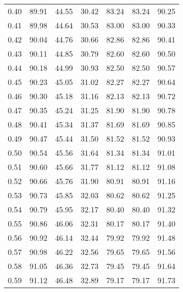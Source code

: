 \begin{tabular}{|c|c|c|c|c|c|c|}
      0.40 &     89.91 &     44.55 &      30.42 &   83.24 &      83.24 &         90.25 \\
      0.41 &     89.98 &     44.64 &      30.53 &   83.00 &      83.00 &         90.33 \\
      0.42 &     90.04 &     44.76 &      30.66 &   82.86 &      82.86 &         90.41 \\
      0.43 &     90.11 &     44.85 &      30.79 &   82.60 &      82.60 &         90.50 \\
      0.44 &     90.18 &     44.99 &      30.93 &   82.50 &      82.50 &         90.57 \\
      0.45 &     90.23 &     45.05 &      31.02 &   82.27 &      82.27 &         90.64 \\
      0.46 &     90.30 &     45.18 &      31.16 &   82.13 &      82.13 &         90.72 \\
      0.47 &     90.35 &     45.24 &      31.25 &   81.90 &      81.90 &         90.78 \\
      0.48 &     90.41 &     45.34 &      31.37 &   81.69 &      81.69 &         90.85 \\
      0.49 &     90.47 &     45.44 &      31.50 &   81.52 &      81.52 &         90.93 \\
      0.50 &     90.54 &     45.56 &      31.64 &   81.34 &      81.34 &         91.01 \\
      0.51 &     90.60 &     45.66 &      31.77 &   81.12 &      81.12 &         91.08 \\
      0.52 &     90.66 &     45.76 &      31.90 &   80.91 &      80.91 &         91.16 \\
      0.53 &     90.73 &     45.85 &      32.03 &   80.62 &      80.62 &         91.25 \\
      0.54 &     90.79 &     45.95 &      32.17 &   80.40 &      80.40 &         91.32 \\
      0.55 &     90.86 &     46.06 &      32.31 &   80.17 &      80.17 &         91.40 \\
      0.56 &     90.92 &     46.14 &      32.44 &   79.92 &      79.92 &         91.48 \\
      0.57 &     90.98 &     46.22 &      32.56 &   79.65 &      79.65 &         91.56 \\
      0.58 &     91.05 &     46.36 &      32.73 &   79.45 &      79.45 &         91.64 \\
      0.59 &     91.12 &     46.48 &      32.89 &   79.17 &      79.17 &         91.73 \\

\end{tabular}
